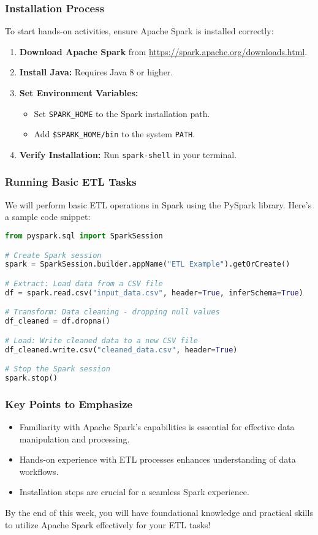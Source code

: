 \documentclass[aspectratio=169]{beamer}
\begin{document}
\begin{frame}[fragile]
    \frametitle{Installation Process}
    To start hands-on activities, ensure Apache Spark is installed correctly:
    \begin{enumerate}
        \item \textbf{Download Apache Spark} from \url{https://spark.apache.org/downloads.html}.
        \item \textbf{Install Java:} Requires Java 8 or higher.
        \item \textbf{Set Environment Variables:}
        \begin{itemize}
            \item Set \texttt{SPARK\_HOME} to the Spark installation path.
            \item Add \texttt{\$SPARK\_HOME/bin} to the system \texttt{PATH}.
        \end{itemize}
        \item \textbf{Verify Installation:} Run \texttt{spark-shell} in your terminal.
    \end{enumerate}
\end{frame}

\begin{frame}[fragile]
    \frametitle{Running Basic ETL Tasks}
    We will perform basic ETL operations in Spark using the PySpark library. Here's a sample code snippet:
    \begin{lstlisting}[language=Python]
from pyspark.sql import SparkSession

# Create Spark session
spark = SparkSession.builder.appName("ETL Example").getOrCreate()

# Extract: Load data from a CSV file
df = spark.read.csv("input_data.csv", header=True, inferSchema=True)

# Transform: Data cleaning - dropping null values
df_cleaned = df.dropna()

# Load: Write cleaned data to a new CSV file
df_cleaned.write.csv("cleaned_data.csv", header=True)

# Stop the Spark session
spark.stop()
    \end{lstlisting}
\end{frame}

\begin{frame}[fragile]
    \frametitle{Key Points to Emphasize}
    \begin{itemize}
        \item Familiarity with Apache Spark’s capabilities is essential for effective data manipulation and processing.
        \item Hands-on experience with ETL processes enhances understanding of data workflows.
        \item Installation steps are crucial for a seamless Spark experience.
    \end{itemize}
    
    By the end of this week, you will have foundational knowledge and practical skills to utilize Apache Spark effectively for your ETL tasks!
\end{frame}
\end{document}
